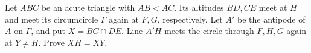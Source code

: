 Let $ABC$ be an acute triangle with $AB<AC$. Its altitudes $BD,CE$ meet at $H$ and meet its circumcircle $\Gamma$ again at $F,G$, respectively. Let $A'$ be the antipode of $A$ on $\Gamma$, and put $X=BC\cap DE$. Line $A'H$ meets the circle through $F,H,G$ again at $Y\ne H$. Prove $XH=XY$.
